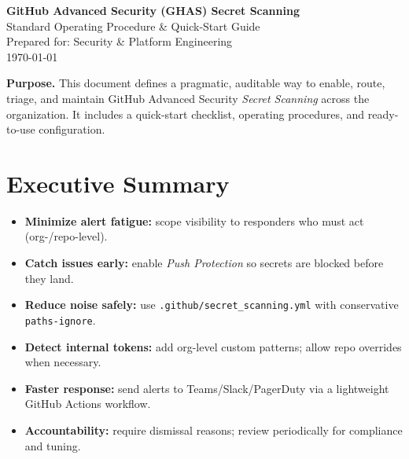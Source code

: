 \documentclass[11pt,a4paper,oneside,notitlepage]{article}
\begin{document}
\begingroup
\let\clearpage\relax
\let\cleardoublepage\relax
\thispagestyle{plain}
\begin{center}
{\LARGE \textbf{GitHub Advanced Security (GHAS) Secret Scanning}}\\[2pt]
{\large Standard Operating Procedure \& Quick-Start Guide}\\[10pt]
Prepared for: Security \& Platform Engineering\\[6pt]
\today
\end{center}
\vspace{0.75\baselineskip}

\begin{tcolorbox}
\textbf{Purpose.} This document defines a pragmatic, auditable way to enable, route, triage, and maintain
GitHub Advanced Security \emph{Secret Scanning} across the organization. It includes
a quick-start checklist, operating procedures, and ready-to-use configuration.
\end{tcolorbox}
\endgroup

\section*{Executive Summary}
\begin{itemize}
  \item \textbf{Minimize alert fatigue:} scope visibility to responders who must act (org-/repo-level).
  \item \textbf{Catch issues early:} enable \emph{Push Protection} so secrets are blocked before they land.
  \item \textbf{Reduce noise safely:} use \texttt{.github/secret\_scanning.yml} with conservative \texttt{paths-ignore}.
  \item \textbf{Detect internal tokens:} add org-level custom patterns; allow repo overrides when necessary.
  \item \textbf{Faster response:} send alerts to Teams/Slack/PagerDuty via a lightweight GitHub Actions workflow.
  \item \textbf{Accountability:} require dismissal reasons; review periodically for compliance and tuning.
\end{itemize}
\end{document}
